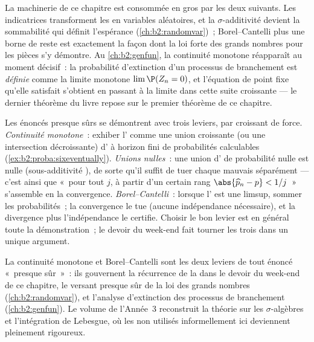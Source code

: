 \begin{remark}
La machinerie de ce chapitre est consommée en gros par les deux
suivants. Les indicatrices transforment les  en variables aléatoires, et
la $\sigma$-additivité devient la sommabilité qui définit
l'espérance (\cref{ch:b2:randomvar})~; Borel--Cantelli plus une
borne de reste  est exactement la façon dont la loi forte des grands
nombres pour les pièces s'y démontre. Au
\cref{ch:b2:genfun}, la continuité monotone réapparaît au
moment décisif~: la probabilité d'extinction d'un processus de
branchement est \emph{définie} comme la limite monotone
$\lim\P(Z_n = 0)$, et l'équation de point fixe qu'elle satisfait
s'obtient en passant à la limite dans cette suite croissante
--- le dernier théorème du livre repose sur le premier théorème de ce
chapitre.
\end{remark}

\begin{remark}
Les énoncés presque sûrs se démontrent avec trois leviers, par 
croissant de force. \emph{Continuité monotone}~:
exhiber l' comme une union croissante (ou une intersection
décroissante) d' à horizon fini de probabilités
calculables (\cref{ex:b2:proba:sixeventually}).
\emph{Unions nulles}~: une union  d' de probabilité
nulle est nulle (sous-additivité ), de sorte qu'il suffit de
tuer chaque mauvais  séparément --- c'est ainsi que «~pour tout
$j$, à partir d'un certain rang $\abs{\widehat p_n - p} < 1/j$~» s'assemble
en la convergence. \emph{Borel--Cantelli}~: lorsque l' est une
limsup, sommer les probabilités~; la convergence le tue
(aucune indépendance nécessaire), et la divergence plus l'indépendance
le certifie. Choisir le bon levier est en général toute la
démonstration~; le devoir du week-end fait tourner les trois dans un unique
argument.
\end{remark}

\begin{remark}
La continuité monotone et Borel--Cantelli sont les deux leviers de
tout énoncé «~presque sûr~»~: ils gouvernent la récurrence de
la  dans le devoir du week-end de ce chapitre, le
versant presque sûr de la loi des grands nombres
(\cref{ch:b2:randomvar}), et l'analyse d'extinction des
processus de branchement (\cref{ch:b2:genfun}). Le volume de l'Année~3
reconstruit la théorie sur les $\sigma$-algèbres et l'intégration de
Lebesgue, où les  non  utilisés
informellement ici deviennent pleinement rigoureux.
\end{remark}

